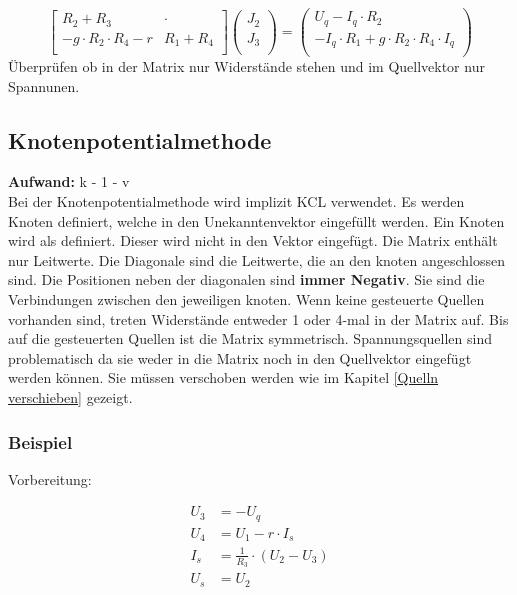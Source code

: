 \[
\begin{bmatrix}
    R_2 + R_3 & \cdot\\
    -g \cdot R_2 \cdot R_4 - r & R_1 + R_4\\
\end{bmatrix}
\begin{pmatrix}
    J_2\\
    J_3\\
\end{pmatrix}
=
\begin{pmatrix}
    U_q - I_q \cdot R_2 \\
    -I_q \cdot R_1 + g \cdot R_2 \cdot R_4 \cdot I_q \\
\end{pmatrix}
\]
Überprüfen ob in der Matrix nur Widerstände stehen und im Quellvektor nur Spannunen. 

\subsection{Knotenpotentialmethode}

\textbf{Aufwand:} k - 1 - v\\

Bei der Knotenpotentialmethode wird implizit KCL verwendet. 
Es werden Knoten definiert, welche in den Unekanntenvektor eingefüllt werden. 
Ein Knoten wird als  definiert. 
Dieser wird nicht in den Vektor eingefügt.
Die Matrix enthält nur Leitwerte.
Die Diagonale sind die Leitwerte, die an den knoten angeschlossen sind. 
Die Positionen neben der diagonalen sind \textbf{immer Negativ}. 
Sie sind die Verbindungen zwischen den jeweiligen knoten. 
Wenn keine gesteuerte Quellen vorhanden sind, treten Widerstände entweder 1 oder 4-mal in der Matrix auf. 
Bis auf die gesteuerten Quellen ist die Matrix symmetrisch. 
Spannungsquellen sind problematisch da sie weder in die Matrix noch in den Quellvektor eingefügt werden können. 
Sie müssen verschoben werden wie im Kapitel \ref{Quelln verschieben} gezeigt.

\subsubsection{Beispiel}

\begin{center}
    
\end{center}

Vorbereitung:

\begin{align*}
    U_3 &= -U_q\\
    U_4 &= U_1 - r\cdot I_s\\
    I_s &= \frac{1}{R_3} \cdot (U_2 - U_3)\\
    U_s &= U_2\\
\end{align*}

